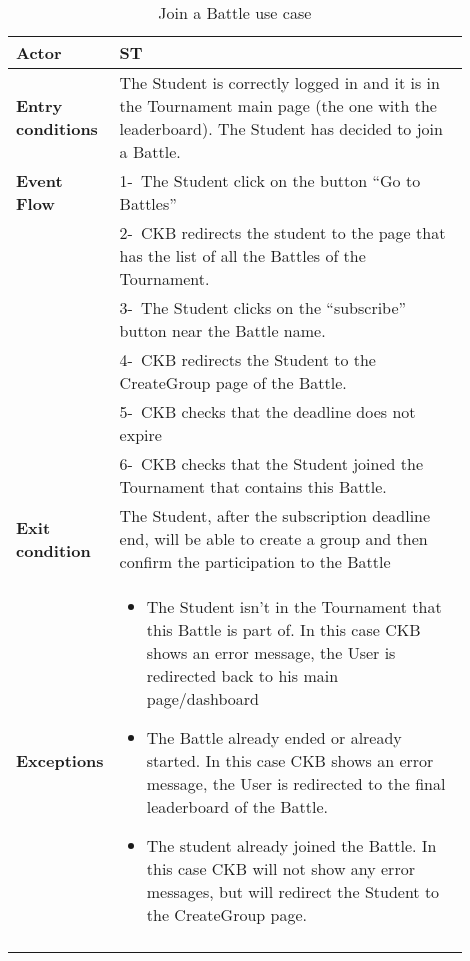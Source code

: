 \begin{center}
    \begin{longtable}{|l|p{0.9\linewidth}|}
        \hline
        \textbf{Actor}            & ST                                                                                                                                                                                        \\
        \hline
        \textbf{Entry conditions} & The Student is correctly logged in and it is in the Tournament main page (the one with the leaderboard). The Student has decided to join a Battle.        \\
        \hline
        \textbf{Event Flow}       & 1-\ The Student click on the button “Go to Battles”        \\
        & 2-\ CKB redirects the student to the page that has the list of all the Battles of the Tournament.        \\
        & 3-\ The Student clicks on the “subscribe” button near the Battle name.        \\
        & 4-\ CKB redirects the Student to the CreateGroup page of the Battle.        \\
        & 5-\ CKB checks that the deadline does not expire\\
        & 6-\ CKB checks that the Student joined the Tournament that contains this Battle.        \\
        \hline
        \textbf{Exit condition}   & The Student, after the subscription deadline end, will be able to create a group and then confirm the participation to the Battle        \\
        \hline
        \textbf{Exceptions}        & \begin{itemize}
            \item The Student isn’t in the Tournament that this Battle is part of. In this case CKB shows an error message, the User is redirected back to his main page/dashboard
            \item The Battle already ended or already started. In this case  CKB shows an error message, the User is redirected to the final leaderboard of the Battle.
            \item The student already joined the Battle. In this case CKB will not show any error messages, but will redirect the Student to the CreateGroup page.
         \end{itemize}    \\
        \hline
        \caption{Join a Battle use case}
        \label{tab: join_a_Battle_use_case}
    \end{longtable}
\end{center}

